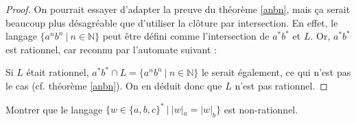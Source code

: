 \begin{proof}
On pourrait essayer d'adapter la preuve du théorème \ref{anbn}, mais ça serait beaucoup plus désagréable que d'utiliser la clôture par intersection. En effet, le langage $\{a^nb^n ~|~n \in \mathbb{N}\}$ peut être défini comme l'intersection de $a^*b^*$ et $L$. Or, $a^*b^*$ est rationnel, car reconnu par l'automate suivant :


\begin{figure}[H]
\centering
{}
\end{figure} 

Si $L$ était rationnel, $a^*b^* \cap L = \{a^nb^n ~|~ n \in \mathbb{N}\}$ le serait également, ce qui n'est pas le cas (cf. théorème \ref{anbn}). On en déduit donc que $L$ n'est pas rationnel.

\end{proof}

\begin{exercice}
Montrer que le langage $\{w \in \{a,b,c\}^* ~|~ |w|_a = |w|_b\}$ est non-rationnel.
\end{exercice}
